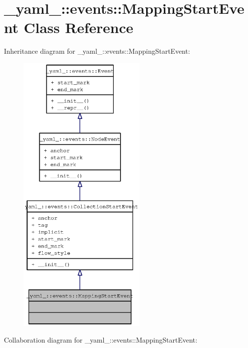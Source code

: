 \section{\_\-yaml\_\-::events::MappingStartEvent Class Reference}
\label{class__yaml___1_1events_1_1MappingStartEvent}
Inheritance diagram for \_\-yaml\_\-::events::MappingStartEvent:\nopagebreak
\begin{figure}[H]
\begin{center}
\leavevmode
\includegraphics[height=400pt]{class__yaml___1_1events_1_1MappingStartEvent__inherit__graph}
\end{center}
\end{figure}
Collaboration diagram for \_\-yaml\_\-::events::MappingStartEvent:\nopagebreak
